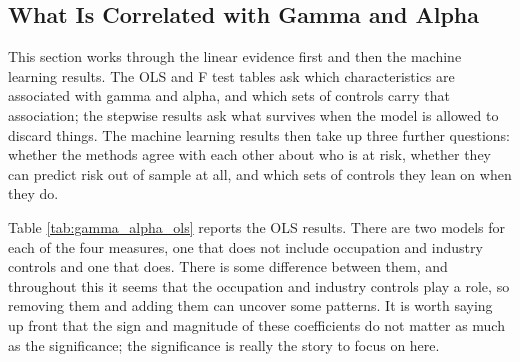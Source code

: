 \documentclass[12pt]{article}
\begin{document}
\begin{onehalfspace}
\subsection{What Is Correlated with Gamma and Alpha}

This section works through the linear evidence first and then the machine learning results. The OLS and F test tables ask which characteristics are associated with gamma and alpha, and which sets of controls carry that association; the stepwise results ask what survives when the model is allowed to discard things. The machine learning results then take up three further questions: whether the methods agree with each other about who is at risk, whether they can predict risk out of sample at all, and which sets of controls they lean on when they do.

Table \ref{tab:gamma_alpha_ols} reports the OLS results. There are two models for each of the four measures, one that does not include occupation and industry controls and one that does. There is some difference between them, and throughout this it seems that the occupation and industry controls play a role, so removing them and adding them can uncover some patterns. It is worth saying up front that the sign and magnitude of these coefficients do not matter as much as the significance; the significance is really the story to focus on here.

\begin{table}[H]
    \centering
    \caption{Gamma and Alpha Regressions: OLS Results (Coefficients x 100)}
    \label{tab:gamma_alpha_ols}
    \resizebox{\textwidth}{!}{%
        
    }
\end{table}

\begin{table}[H]
    \centering
    \caption{Distribution of the OLS-Predicted Gamma and Alpha (x 100)}
    \label{tab:ols_pred_summary_stats}
    
\end{table}



\end{onehalfspace}
\end{document}
